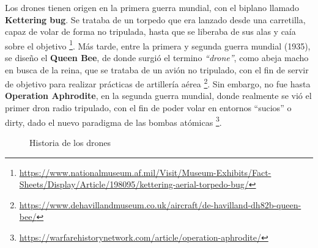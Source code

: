 Los drones tienen origen en la primera guerra mundial, con el biplano llamado \textbf{Kettering bug}. Se trataba de un torpedo que era lanzado desde una carretilla, capaz de volar de forma no tripulada, hasta que se liberaba de sus alas y caía sobre el objetivo \footnote[7]{\url{https://www.nationalmuseum.af.mil/Visit/Museum-Exhibits/Fact-Sheets/Display/Article/198095/kettering-aerial-torpedo-bug/}}. Más tarde, entre la primera y segunda guerra mundial (1935), se diseño el \textbf{Queen Bee}, de donde surgió el termino \emph{``drone''}, como abeja macho en busca de la reina, que se trataba de un avión no tripulado, con el fin de servir de objetivo para realizar prácticas de artillería aérea \footnote[8]{\url{https://www.dehavillandmuseum.co.uk/aircraft/de-havilland-dh82b-queen-bee/}}. Sin embargo, no fue hasta \textbf{Operation Aphrodite}, en la segunda guerra mundial, donde realmente se vió el primer dron radio tripulado, con el fin de poder volar en entornos ``sucios'' o dirty, dado el nuevo paradigma de las bombas atómicas \footnote[9]{\url{https://warfarehistorynetwork.com/article/operation-aphrodite/}}.\\

\begin{figure} [h]
	\centering
	\quad
	\quad
	\caption{Historia de los drones}
	\label{fig:drone_history}
\end{figure}

